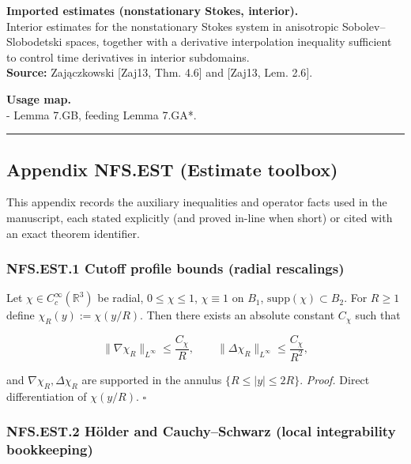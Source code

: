 \documentclass[
  11pt,
]{article}
\begin{document}
\textbf{Imported estimates (nonstationary Stokes, interior).}\\
Interior estimates for the nonstationary Stokes system in anisotropic Sobolev--Slobodetski spaces, together with a derivative interpolation inequality sufficient to control time derivatives in interior subdomains.\\
\textbf{Source:} Zajączkowski {[}Zaj13, Thm. 4.6{]} and {[}Zaj13, Lem. 2.6{]}.

\textbf{Usage map.}\\
- Lemma 7.GB, feeding Lemma 7.GA*.

\begin{center}\rule{0.5\linewidth}{0.5pt}\end{center}

\hypertarget{appendix-nfs.est-estimate-toolbox}{%
\subsection{Appendix NFS.EST (Estimate toolbox)}\label{appendix-nfs.est-estimate-toolbox}}

This appendix records the auxiliary inequalities and operator facts used in the manuscript, each stated explicitly (and proved in-line when short) or cited with an exact theorem identifier.

\hypertarget{nfs.est.1-cutoff-profile-bounds-radial-rescalings}{%
\subsubsection{NFS.EST.1 Cutoff profile bounds (radial rescalings)}\label{nfs.est.1-cutoff-profile-bounds-radial-rescalings}}

Let \(\chi\in C_c^\infty(\mathbb R^3)\) be radial, \(0\le \chi\le 1\), \(\chi\equiv 1\) on \(B_1\), \(\mathrm{supp}(\chi)\subset B_2\). For \(R\ge 1\) define \(\chi_R(y):=\chi(y/R)\). Then there exists an absolute constant \(C_\chi\) such that

\begin{equation}
\|\nabla \chi_R\|_{L^\infty}\le \frac{C_\chi}{R},\qquad
\|\Delta \chi_R\|_{L^\infty}\le \frac{C_\chi}{R^2},
\tag{EST1}\label{eq:EST1_cutoff}
\end{equation}

and \(\nabla\chi_R,\Delta\chi_R\) are supported in the annulus \(\{R\le |y|\le 2R\}\). \emph{Proof.} Direct differentiation of \(\chi(y/R)\). \(\square\)

\hypertarget{nfs.est.2-huxf6lder-and-cauchyschwarz-local-integrability-bookkeeping}{%
\subsubsection{NFS.EST.2 Hölder and Cauchy--Schwarz (local integrability bookkeeping)}\label{nfs.est.2-huxf6lder-and-cauchyschwarz-local-integrability-bookkeeping}}
\end{document}
